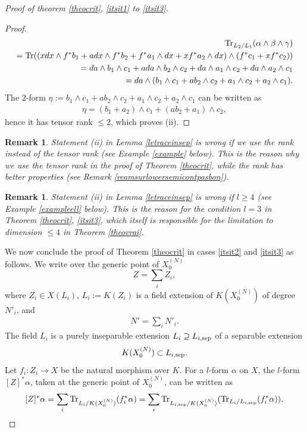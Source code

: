\documentclass[10pt]{article}
\newtheorem{rema}[theo]{Remark}
\begin{document}
\begin{proof}[Proof of theorem \ref{theocrit}, \ref{itsit1} to \ref{itsit3}]
\begin{proof}
\begin{eqnarray}\label{eqwedgetroistrace} {\rm Tr}_{L_2/L_1}(\alpha\wedge\beta\wedge \gamma)\\
\nonumber
={\rm Tr}((xdx\wedge f^*b_1+a dx\wedge f^*b_2+f^*a_1\wedge dx+xf^*a_2\wedge dx)\wedge (f^*c_1+xf^*c_2))\\
\nonumber
= da\wedge b_1\wedge c_1+ada\wedge b_2\wedge c_2+da\wedge a_1\wedge c_2+da\wedge a_2\wedge c_1\\
\nonumber =da\wedge(b_1\wedge c_1+a b_2\wedge c_2+ a_1\wedge c_2+ a_2\wedge c_1 ).
\end{eqnarray}
The $2$-form $\eta:=b_1\wedge c_1+a b_2\wedge c_2+ a_1\wedge c_2+ a_2\wedge c_1$ can be written as
\begin{eqnarray}\label{eqeta}\eta=(b_1+a_2)\wedge c_1+(ab_2+a_1)\wedge c_2,\end{eqnarray} hence it has tensor rank $\leq 2$, which proves (ii).
\end{proof}
\begin{rema}{\rm Statement (ii) in Lemma \ref{letraceinsep} is wrong if we use the rank instead of the tensor rank (see Example \ref{example} below). This is the reason why we use the tensor rank in the proof of Theorem \ref{theocrit}, while the rank has better properties (see Remark \ref{reamsurlowersemicontpasbon}).}
\end{rema}
\begin{rema}{\rm Statement (ii) in Lemma \ref{letraceinsep} is wrong if $l\geq 4$ (see Example \ref{exampleell} below). This is the reason for the condition $l= 3$ in Theorem \ref{theocrit}, \ref{itsit3}, which itself is responsible for the limitation to dimension $\leq 4$ in Theorem \ref{theovrai}.}
\end{rema}
We now conclude the proof of Theorem \ref{theocrit} in cases \ref{itsit2} and \ref{itsit3}  as follows. We write over the generic point of $X^{(N)}_0$
$$Z=\sum_i Z_i,$$  where $Z_i\in X(L_i)$, $L_i:=K(Z_i)$ is a field  extension of $K(X^{(N)}_0)$ of  degree $N'_i$, and \begin{eqnarray}\label{eqpourNprimeni} N'=\sum_iN'_i.
\end{eqnarray}
The  field $L_i$  is  a purely inseparable extension $L_i\supseteq L_{i,{\rm sep}}$ of a separable extension
$$K(X^{(N)}_0)\subset L_{i,{\rm sep}}.$$
Let $f_i: Z_i\rightarrow X$ be the natural morphism over $K$. For a $l$-form $\alpha$ on $X$, the $l$-form
$[Z]^*\alpha$, taken at the generic point of $X^{(N)}_0$, can be written as
\begin{eqnarray}\label{eqtraceomegasepinsep}[Z]^*\alpha=\sum_i{\rm Tr}_{L_i/K(X^{(N)}_0)}( f_i^*\alpha)=\sum_i{\rm Tr}_{L_{i,{\rm sep}}/K(X^{(N)}_0)}({\rm Tr}_{L_i/L_{i,{\rm sep}}}( f_i^*\alpha)).\end{eqnarray}

\end{proof}
\end{document}
